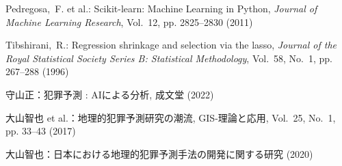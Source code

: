 \begin{thebibliography}{}
  Pedregosa,~F. et al.: Scikit-learn: Machine Learning in {P}ython, {\em Journal of Machine Learning Research}, Vol.~12, pp. 2825--2830 (2011)
  
  Tibshirani,~R.: Regression shrinkage and selection via the lasso, {\em Journal of the Royal Statistical Society Series B: Statistical Methodology}, Vol.~58, No.~1, pp. 267--288 (1996)
  
  守山正：犯罪予測 : AIによる分析, 成文堂 (2022)
  
  大山智也 et al.：地理的犯罪予測研究の潮流, GIS-理論と応用, Vol.~25, No.~1, pp. 33--43 (2017)
  
  大山智也：日本における地理的犯罪予測手法の開発に関する研究 (2020)
  
  \end{thebibliography}
  
